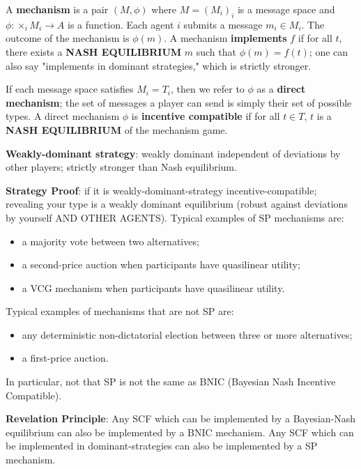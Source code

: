\documentclass[10pt]{scrartcl}
\newcommand{\vocab}[1]{\textbf{\color{blue} #1}}
\begin{document}
\begin{multicols*}{2}
    A \vocab{mechanism} is a pair $(M, \phi)$ where
    $M = (M_i)_i$ is a message space and
    $\phi: \times_i M_i \to A$ is a function.
    Each agent $i$ submits a message $m_i \in M_i$.
    The outcome of the mechanism is $\phi(m)$.
    A mechanism \vocab{implements} $f$ if for all $t$,
    there exists a \textbf{NASH EQUILIBRIUM} $m$ such that
    $\phi(m) = f(t)$; one can also say
    "implements in dominant strategies," which is strictly stronger.

    If each message space satisfies $M_i = T_i$,
    then we refer to $\phi$ as a \vocab{direct mechanism};
    the set of messages a player can send is simply their set of possible types.
    A direct mechanism $\phi$ is \vocab{incentive compatible} if for all $t \in T$,
    $t$ is a \textbf{NASH EQUILIBRIUM} of the mechanism game.


    \vocab{Weakly-dominant strategy}: weakly dominant independent of deviations
    by other players; strictly stronger than Nash equilibrium.

    \vocab{Strategy Proof}: if it is weakly-dominant-strategy incentive-compatible;
    revealing your type is a weakly dominant equilibrium (robust against deviations by
    yourself AND OTHER AGENTS). Typical examples of SP mechanisms are:
    \begin{itemize}
        \item a majority vote between two alternatives;
        \item a second-price auction when participants have quasilinear utility;
        \item a VCG mechanism when participants have quasilinear utility.
    \end{itemize}
    Typical examples of mechanisms that are not SP are:
    \begin{itemize}
        \item any deterministic non-dictatorial election between three or more alternatives;
        \item a first-price auction.
    \end{itemize}

    In particular, not that SP is not the same as BNIC (Bayesian Nash Incentive Compatible).

    \vocab{Revelation Principle}: Any SCF which can be implemented by a Bayesian-Nash
    equilibrium can also be implemented by a BNIC mechanism. Any SCF which can be
    implemented in dominant-strategies can also be implemented by a SP mechanism.


\end{multicols*}
\end{document}
